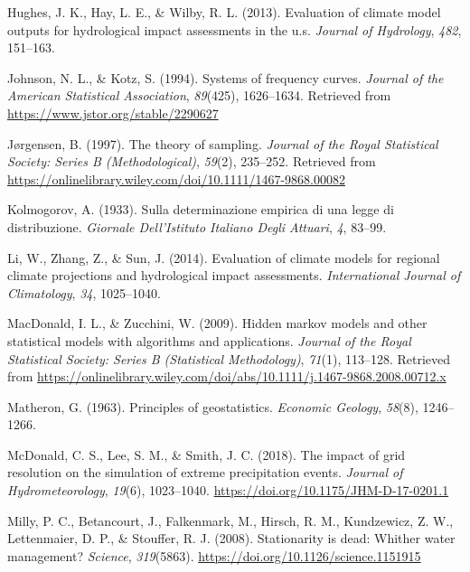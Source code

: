 \documentclass[
]{agujournal2019}
\newlength{\cslhangindent}
\newenvironment{CSLReferences}[2] %
 {\begin{list}{}{%
  \setlength{\itemindent}{0pt}
  \setlength{\leftmargin}{0pt}
  \setlength{\parsep}{0pt}
  \ifodd #1
   \setlength{\leftmargin}{\cslhangindent}
   \setlength{\itemindent}{-1\cslhangindent}
  \fi
  \setlength{\itemsep}{#2\baselineskip}}}
 {\end{list}}
\begin{document}
\begin{CSLReferences}{1}{0}
Hughes, J. K., Hay, L. E., \& Wilby, R. L. (2013). Evaluation of climate
model outputs for hydrological impact assessments in the u.s.
\emph{Journal of Hydrology}, \emph{482}, 151--163.

Johnson, N. L., \& Kotz, S. (1994). Systems of frequency curves.
\emph{Journal of the American Statistical Association}, \emph{89}(425),
1626--1634. Retrieved from \url{https://www.jstor.org/stable/2290627}

Jørgensen, B. (1997). The theory of sampling. \emph{Journal of the Royal
Statistical Society: Series B (Methodological)}, \emph{59}(2), 235--252.
Retrieved from
\url{https://onlinelibrary.wiley.com/doi/10.1111/1467-9868.00082}

Kolmogorov, A. (1933). Sulla determinazione empirica di una legge di
distribuzione. \emph{Giornale Dell'Istituto Italiano Degli Attuari},
\emph{4}, 83--99.

Li, W., Zhang, Z., \& Sun, J. (2014). Evaluation of climate models for
regional climate projections and hydrological impact assessments.
\emph{International Journal of Climatology}, \emph{34}, 1025--1040.

MacDonald, I. L., \& Zucchini, W. (2009). Hidden markov models and other
statistical models with algorithms and applications. \emph{Journal of
the Royal Statistical Society: Series B (Statistical Methodology)},
\emph{71}(1), 113--128. Retrieved from
\url{https://onlinelibrary.wiley.com/doi/abs/10.1111/j.1467-9868.2008.00712.x}

Matheron, G. (1963). Principles of geostatistics. \emph{Economic
Geology}, \emph{58}(8), 1246--1266.

McDonald, C. S., Lee, S. M., \& Smith, J. C. (2018). The impact of grid
resolution on the simulation of extreme precipitation events.
\emph{Journal of Hydrometeorology}, \emph{19}(6), 1023--1040.
\url{https://doi.org/10.1175/JHM-D-17-0201.1}

Milly, P. C., Betancourt, J., Falkenmark, M., Hirsch, R. M., Kundzewicz,
Z. W., Lettenmaier, D. P., \& Stouffer, R. J. (2008). Stationarity is
dead: Whither water management? \emph{Science}, \emph{319}(5863).
\url{https://doi.org/10.1126/science.1151915}


\end{CSLReferences}
\end{document}
